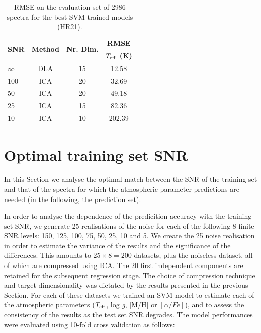 \documentclass[a4paper,fleqn,usenatbib]{mnras}
\begin{document}
{{{\begin{table}
\centering
\caption{RMSE on the evaluation set of 2986 spectra for the best SVM trained models (HR21).}
\label{tab:hr21}
\begin{tabular}{l c c c}
\hline
\multirow{2}{*}{\textbf{SNR}} & \multirow{2}{*}{\textbf{Method}} & \multirow{2}{*}{\textbf{Nr. Dim.}} & {\bf RMSE}\\
 &  &  & \textbf{$T_{\rm eff}$ (K)}\\
\hline
$\infty$ & DLA & 15 & 12.58\\
100 & ICA & 20 & 32.69\\
50 & ICA & 20 & 49.18\\
25 & ICA & 15 & 82.36\\
10 & ICA & 10 & 202.39\\
\hline
\end{tabular}
\end{table}

\section{Optimal training set SNR}
\label{sec:comparison2}

In this Section we analyse the optimal match between the SNR of the training
set and that of the spectra for which the atmospheric parameter
predictions are needed (in the following, the prediction set).

In order to analyse the dependence of the predicition accuracy with
the training set SNR, we generate 25 realisations of the noise for
each of the following 8 finite SNR levels: 150, 125, 100, 75, 50, 25,
10 and 5. We create the 25 noise realisation in order to estimate the
variance of the results and the significance of the differences. 
This amounts to $25\times 8=200$ datasets, plus the
noiseless dataset, all of which are compressed using ICA. The 20 
first independent components are retained for the subsequent 
regression stage. The choice of compression technique and target 
dimensionality was dictated by the results presented in the previous 
Section. For each of these datasets we trained an SVM
model to estimate each of the atmospheric parameters ($T_{\rm
  eff}$, log \textit{g}, [M/H] or $\left[ \alpha/Fe \right]$), and to 
assess the consistency of the results as the test set SNR degrades. 
The model performances were evaluated using 10-fold cross validation 
as follows:

}}}
\end{document}

